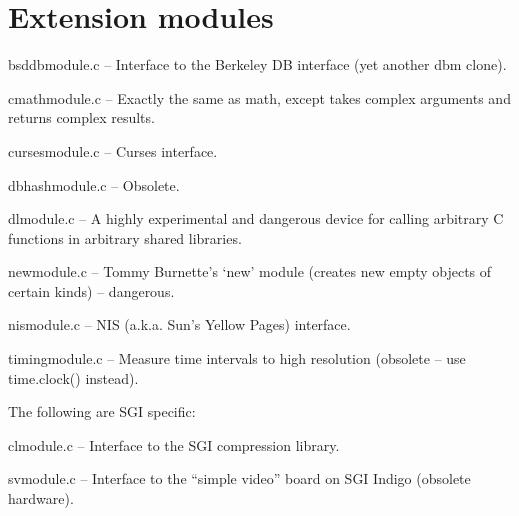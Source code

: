 \section{Extension modules}

bsddbmodule.c -- Interface to the Berkeley DB interface (yet another
dbm clone).

cmathmodule.c -- Exactly the same as math, except takes complex
arguments and returns complex results.

cursesmodule.c -- Curses interface.

dbhashmodule.c -- Obsolete.

dlmodule.c --  A highly experimental and dangerous device for calling
arbitrary C functions in arbitrary shared libraries.

newmodule.c -- Tommy Burnette's `new' module (creates new empty
objects of certain kinds) -- dangerous.

nismodule.c -- NIS (a.k.a. Sun's Yellow Pages) interface.

timingmodule.c -- Measure time intervals to high resolution (obsolete
-- use time.clock() instead).

The following are SGI specific:

clmodule.c -- Interface to the SGI compression library.

svmodule.c -- Interface to the ``simple video'' board on SGI Indigo
(obsolete hardware).
